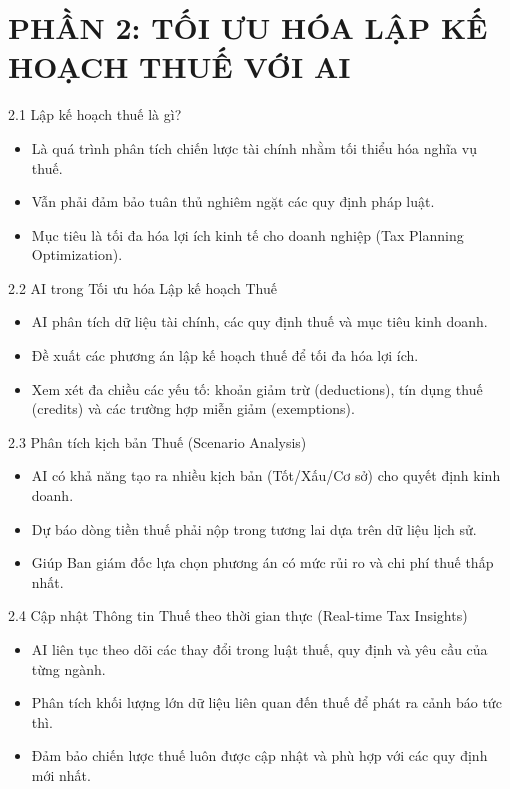 \documentclass[aspectratio=169]{beamer}
\begin{document}
\section{PHẦN 2: TỐI ƯU HÓA LẬP KẾ HOẠCH THUẾ VỚI AI}


\begin{frame}{2.1 Lập kế hoạch thuế là gì?}
    \begin{itemize}
        \item Là quá trình phân tích chiến lược tài chính nhằm tối thiểu hóa nghĩa vụ thuế.
        \item Vẫn phải đảm bảo tuân thủ nghiêm ngặt các quy định pháp luật.
        \item Mục tiêu là tối đa hóa lợi ích kinh tế cho doanh nghiệp (Tax Planning Optimization).
    \end{itemize}
\end{frame}


\begin{frame}{2.2 AI trong Tối ưu hóa Lập kế hoạch Thuế}
    \begin{itemize}
        \item AI phân tích dữ liệu tài chính, các quy định thuế và mục tiêu kinh doanh.
        \item Đề xuất các phương án lập kế hoạch thuế để tối đa hóa lợi ích.
        \item Xem xét đa chiều các yếu tố: khoản giảm trừ (deductions), tín dụng thuế (credits) và các trường hợp miễn giảm (exemptions).
    \end{itemize}
\end{frame}


\begin{frame}{2.3 Phân tích kịch bản Thuế (Scenario Analysis)}
    \begin{itemize}
        \item AI có khả năng tạo ra nhiều kịch bản (Tốt/Xấu/Cơ sở) cho quyết định kinh doanh.
        \item Dự báo dòng tiền thuế phải nộp trong tương lai dựa trên dữ liệu lịch sử.
        \item Giúp Ban giám đốc lựa chọn phương án có mức rủi ro và chi phí thuế thấp nhất.
    \end{itemize}
\end{frame}


\begin{frame}{2.4 Cập nhật Thông tin Thuế theo thời gian thực (Real-time Tax Insights)}
    \begin{itemize}
        \item AI liên tục theo dõi các thay đổi trong luật thuế, quy định và yêu cầu của từng ngành.
        \item Phân tích khối lượng lớn dữ liệu liên quan đến thuế để phát ra cảnh báo tức thì.
        \item Đảm bảo chiến lược thuế luôn được cập nhật và phù hợp với các quy định mới nhất.
    \end{itemize}
\end{frame}
\end{document}
